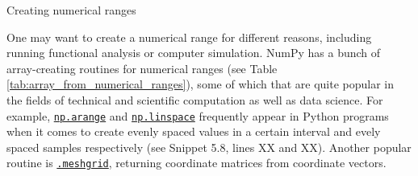 \documentclass[a4paper,11pt]{book}
\numberwithin{figure}{chapter}
\numberwithin{table}{chapter}
\newcommand{\question}[1]{%
    \begin{tcolorbox}[colback=comp_c!10,colframe=comp_c,sidebyside align=top,width=\linewidth,before skip=1ex]
        #1
    \end{tcolorbox}
    \switchcolumn%
}
\newcommand{\note}[1]{%
    \begin{tcolorbox}[colback=white!0,colframe=white!10,width=\linewidth,before skip=1ex]
        #1
    \end{tcolorbox}
}
\begin{document}
\begin{paracol}{2}
	\question{\raggedright Creating numerical ranges}
	\note{One may want to create a numerical range for different reasons, including running functional analysis or computer simulation. NumPy has a bunch of array-creating routines for numerical ranges (see Table \ref{tab:array_from_numerical_ranges}), some of which that are quite popular in the fields of technical and scientific computation as well as data science. For example, \href{https://numpy.org/doc/stable/reference/generated/numpy.arange.html\#numpy.arange}{\texttt{np.arange}} and \href{https://numpy.org/doc/stable/reference/generated/numpy.linspace.html\#numpy.linspace}{\texttt{np.linspace}} frequently appear in Python programs when it comes to create evenly spaced values in a certain interval and evely spaced samples respectively (see Snippet 5.8, lines XX and XX). Another popular routine is \href{https://numpy.org/doc/stable/reference/generated/numpy.meshgrid.html\#numpy.meshgrid}{\texttt{.meshgrid}}, returning coordinate matrices from coordinate vectors.}
\end{paracol}
\end{document}
